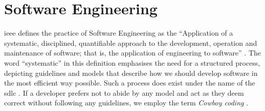 
\chapter{Software Engineering}

\label{ch:software-engineering}
\acrfull{ieee} defines the practice of Software Engineering as the ``Application of a systematic, disciplined, quantifiable approach to the development, operation and maintenance of software; that is, the application of engineering to software'' \cite[p.~421]{8016712}. The word ``systematic'' in this definition emphasises the need for a structured process, depicting guidelines and models that describe how we should develop software in the most efficient way possible. Such a process does exist under the name of the \acrfull{sdlc} \cite[p.~420]{8016712}. If a developer prefers not to abide by any model and act as they deem correct without following any guidelines, we employ the term \emph{Cowboy coding} \cite[p.~34]{landry2011iterative}.



\newpage


